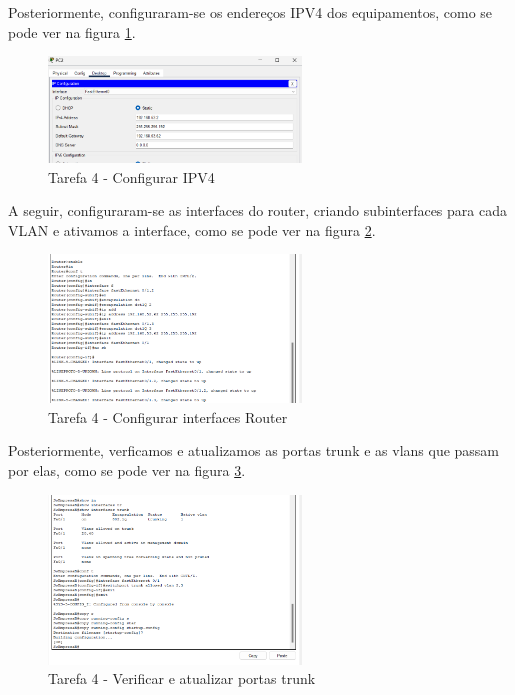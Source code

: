 \documentclass[11pt,english, openright, oneside]{book}
\begin{document}
Posteriormente, configuraram-se os endereços IPV4 dos equipamentos, como se pode ver na figura \ref{fig:4.1.4}.

\begin{figure}[H]
    \centering
    \includegraphics[width=0.6\textwidth]{imagens/Tarefa4/4.1.4.png}
    \caption{Tarefa 4 - Configurar IPV4}
    \label{fig:4.1.4}
\end{figure}
\vspace{0.2cm}

A seguir, configuraram-se as interfaces do router, criando subinterfaces para cada VLAN e ativamos a interface, como se pode ver na figura \ref{fig:4.1.5}.

\begin{figure}[H]
    \centering
    \includegraphics[width=0.6\textwidth]{imagens/Tarefa4/4.1.5.png}
    \caption{Tarefa 4 - Configurar interfaces Router}
    \label{fig:4.1.5}
\end{figure}
\vspace{0.2cm}

Posteriormente, verficamos e atualizamos as portas trunk e as vlans que passam por elas, como se pode ver na figura \ref{fig:4.1.6}.

\begin{figure}[H]
    \centering
    \includegraphics[width=0.6\textwidth]{imagens/Tarefa4/4.1.6.png}
    \caption{Tarefa 4 - Verificar e atualizar portas trunk}
    \label{fig:4.1.6}
\end{figure}
\vspace{0.2cm}
\end{document}
